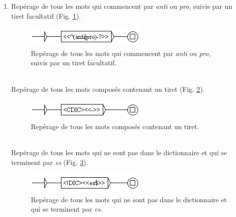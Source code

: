 \documentclass[xcolor={table,usenames,dvipsnames}]{article}
\begin{document}
\begin{enumerate}
	\item Repérage de tous les mots qui commencent par \textit{anti} ou \textit{pro}, suivis par un tiret facultatif (Fig. \ref{fig:anti_pro}).
		\begin{figure}[H] %
		\centering
		\includegraphics[width=.7\linewidth]{img/anti_pro.png}
		\caption{Repérage de tous les mots qui commencent par \textit{anti} ou \textit{pro}, suivis par un tiret facultatif.}
		\label{fig:anti_pro}
	\end{figure}
	\bigskip
	\\
	
		Repérage de tous les mots composés contenant un tiret (Fig. \ref{fig:composes}).
	\begin{figure}[H] %
		\centering
		\includegraphics[width=.7\linewidth]{img/composes.png}
		\caption{Repérage de tous les mots composés contenant un tiret.}
		\label{fig:composes}
	\end{figure}
	\bigskip
	\\
	
			Repérage de tous les mots qui ne sont pas dans le dictionnaire et qui se terminent par \textit{es} (Fig. \ref{fig:es}).
	\begin{figure}[H] %
		\centering
		\includegraphics[width=.7\linewidth]{img/es.png}
		\caption{Repérage de tous les mots qui ne sont pas dans le dictionnaire et qui se terminent par \textit{es}.}
		\label{fig:es}
	\end{figure}
	

\end{enumerate}
\end{document}
